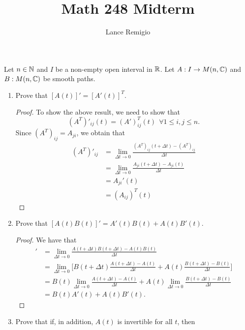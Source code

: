 \documentclass[a4paper]{article}
\title{Math 248 Midterm}
\author{Lance Remigio}
\begin{document}
\maketitle

\begin{problem}
   Let \( n \in \mathbb{N}  \) and \( I  \) be a non-empty open interval in \( \mathbb{R}  \). Let \( A : I \to M(n,\mathbb{C} ) \) and \( B : M(n,\mathbb{C}) \) be smooth paths. 
\end{problem}
\begin{enumerate}
    \item Prove that \( [A(t)]' = [A'(t)]^{T} \).
        \begin{proof}
        To show the above result, we need to show that 
        \[  (A^{T})'_{ij}(t) = (A')^{T}_{ij}(t) \ \ \forall 1 \leq i,j \leq n.  \]
    Since \( (A^{T})_{ij} = {A}_{ji} \), we obtain that 
    \begin{align*}
        (A^{T})'_{ij} &= \lim_{ \Delta t  \to 0  }  \frac{ (A^{T})_{ij}  (t + \Delta t) - (A^{T})_{ij}  }{ \Delta t} \\
                      &= \lim_{\Delta t \to  0} \frac{ {A}_{ji}(t + \Delta t ) - {A}_{ji}(t)  }{  \Delta t  }  \\
                      &= {A}_{ji}'(t)  \\
                      &= ({A}_{ij})^{T}(t)
    \end{align*}
       \end{proof}
    \item  Prove that \( [A(t)B(t)]' = A'(t)B(t) + A(t) B'(t) \).
\begin{proof}
We have that 
    \begin{align*}
        [A(t) B(t)]' &= \lim_{ \Delta t  \to 0  } \frac{ A(t + \Delta t ) B(t + \Delta t) - A(t) B(t) }{ \Delta t  }  \\
                     &= \lim_{ \Delta t  \to 0  } \Big[ B(t + \Delta t ) \frac{ A(t + \Delta t ) - A(t) }{ \Delta t  }  + A(t) \frac{ B(t+ \Delta t ) - B(t) }{ \Delta t  } \Big] \\
                     &= B(t) \lim_{ \Delta t  \to 0  }  \frac{ A(t + \Delta t  ) - A(t) }{  \Delta t  }  + A(t) \lim_{ \Delta t  \to 0  }  \frac{ B(t+ \Delta t) - B(t) }{  \Delta t  } \\
                     &= B(t) A'(t) + A(t) B'(t).
    \end{align*}
    \end{proof}
    \item  Prove that if, in addition, \( A(t) \) is invertible for all \( t  \), then 

\end{enumerate}
\end{document}
